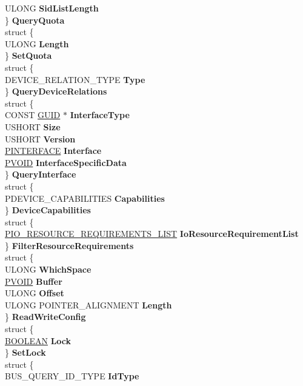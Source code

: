 \begin{DoxyCompactItemize}
\begin{tabbing}
\>\>ULONG {\bfseries SidListLength}\\
\>\} {\bfseries QueryQuota}\\
\>struct \{\\
\>\>ULONG {\bfseries Length}\\
\>\} {\bfseries SetQuota}\\
\>struct \{\\
\>\>DEVICE\_RELATION\_TYPE {\bfseries Type}\\
\>\} {\bfseries QueryDeviceRelations}\\
\>struct \{\\
\>\>CONST \hyperlink{interface_g_u_i_d}{GUID} $\ast$ {\bfseries InterfaceType}\\
\>\>USHORT {\bfseries Size}\\
\>\>USHORT {\bfseries Version}\\
\>\>\hyperlink{struct___i_n_t_e_r_f_a_c_e}{PINTERFACE} {\bfseries Interface}\\
\>\>\hyperlink{interfacevoid}{PVOID} {\bfseries InterfaceSpecificData}\\
\>\} {\bfseries QueryInterface}\\
\>struct \{\\
\>\>PDEVICE\_CAPABILITIES {\bfseries Capabilities}\\
\>\} {\bfseries DeviceCapabilities}\\
\>struct \{\\
\>\>\hyperlink{struct___i_o___r_e_s_o_u_r_c_e___r_e_q_u_i_r_e_m_e_n_t_s___l_i_s_t}{PIO\_RESOURCE\_REQUIREMENTS\_LIST} {\bfseries IoResourceRequirementList}\\
\>\} {\bfseries FilterResourceRequirements}\\
\>struct \{\\
\>\>ULONG {\bfseries WhichSpace}\\
\>\>\hyperlink{interfacevoid}{PVOID} {\bfseries Buffer}\\
\>\>ULONG {\bfseries Offset}\\
\>\>ULONG POINTER\_ALIGNMENT {\bfseries Length}\\
\>\} {\bfseries ReadWriteConfig}\\
\>struct \{\\
\>\>\hyperlink{_processor_bind_8h_a112e3146cb38b6ee95e64d85842e380a}{BOOLEAN} {\bfseries Lock}\\
\>\} {\bfseries SetLock}\\
\>struct \{\\
\>\>BUS\_QUERY\_ID\_TYPE {\bfseries IdType}\\

\end{tabbing}
\end{DoxyCompactItemize}
